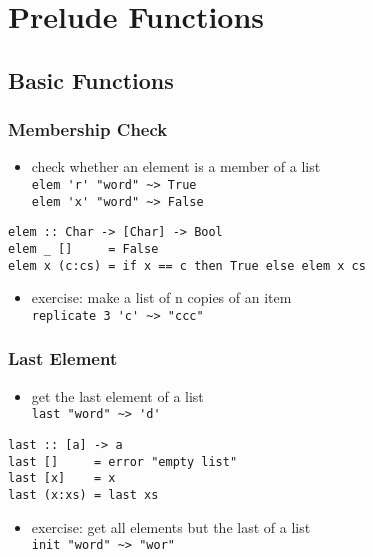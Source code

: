 \documentclass[dvipsnames]{beamer}
\theoremstyle{plain}
\begin{document}
\section{Prelude Functions}

\subsection{Basic Functions}

\begin{frame}[fragile]
  \frametitle{Membership Check}

  \begin{itemize}
    \item check whether an element is a member of a list\\
      \lstinline[style=exclamfix]|elem 'r' "word" ~> True|\\
      \lstinline[style=exclamfix]|elem 'x' "word" ~> False|
  \end{itemize}

  \begin{exampleblock}{}
    \begin{lstlisting}[deletekeywords={elem}]
elem :: Char -> [Char] -> Bool
elem _ []     = False
elem x (c:cs) = if x == c then True else elem x cs
    \end{lstlisting}
  \end{exampleblock}

  \pause
  \begin{itemize}
    \item exercise: make a list of n copies of an item\\
      \lstinline|replicate 3 'c' ~> "ccc"|
  \end{itemize}
\end{frame}

\begin{frame}[fragile]
  \frametitle{Last Element}

  \begin{itemize}
    \item get the last element of a list\\
      \lstinline[style=exclamfix]|last "word" ~> 'd'|
  \end{itemize}

  \begin{exampleblock}{}
    \begin{lstlisting}[deletekeywords={last}]
last :: [a] -> a
last []     = error "empty list"
last [x]    = x
last (x:xs) = last xs
    \end{lstlisting}
  \end{exampleblock}

  \pause
  \begin{itemize}
    \item exercise: get all elements but the last of a list\\
      \lstinline[style=exclamfix]|init "word" ~> "wor"|
  \end{itemize}
\end{frame}
\end{document}
